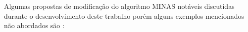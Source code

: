 
  
  
  
  
  
  




Algumas propostas de modificação do algoritmo MINAS notáveis discutidas durante o desenvolvimento
deste trabalho 
porém alguns exemplos mencionados não abordados são \cite{DaSilva2018,DaSilva2018thesis,Costa2019}:

